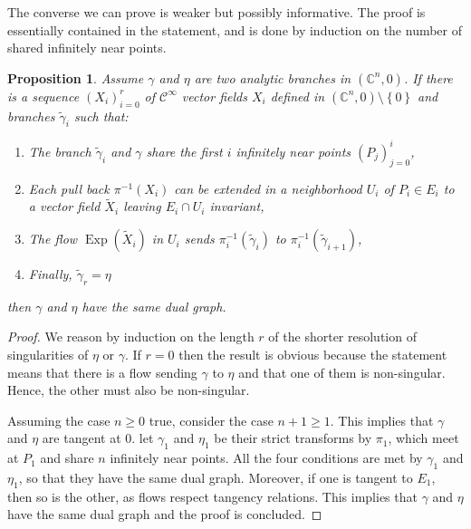 \documentclass[a4paper,10pt]{amsart}
\newtheorem{proposition}[theorem]{Proposition}
\DeclareMathOperator{\Exp}{Exp}
\begin{document}
The converse we can prove is weaker but possibly informative. The proof is essentially contained in the statement, and is done by induction on the number of shared infinitely near points.
\begin{proposition}
  Assume $\gamma$ and $\eta$ are two analytic branches in $(\mathbb{C}^n,0)$. If there is a sequence $(X_i)_{i=0}^{r}$ of $\mathcal{C}^{\infty}$ vector fields $X_i$ defined in $(\mathbb{C}^n,0)\setminus \left\{ 0 \right\}$ and branches $\tilde{\gamma}_{i}$ such that:
  \begin{enumerate}
  \item The branch $\tilde{\gamma}_i$ and $\gamma$ share the first $i$ infinitely near points $(P_j)_{j=0}^i$,
  \item Each pull back $\pi^{-1}(X_{i})$ can be extended in a neighborhood $U_{i}$ of $P_{i}\in E_i$ to a vector field $\tilde{X}_i$ leaving $E_i\cap U_i$ invariant,
  \item The flow $\Exp(\tilde{X}_i)$ in $U_i$ sends $\pi^{-1}_{i}(\tilde{\gamma}_i)$ to $\pi^{-1}_{i}(\tilde{\gamma}_{i+1})$,
  \item Finally, $\tilde{\gamma}_r=\eta$
  \end{enumerate}
  then $\gamma$ and $\eta$ have the same dual graph.
\end{proposition}
\begin{proof}
  We reason by induction on the length $r$ of the shorter resolution of singularities of $\eta$ or $\gamma$. If $r=0$ then the result is obvious because the statement means that there is a flow sending $\gamma$ to $\eta$ and that one of them is non-singular. Hence, the other must also be non-singular.

  Assuming the case $n\geq 0$ true, consider the case $n+1\geq 1$. This implies that $\gamma$ and $\eta$ are tangent at $0$. let $\gamma_1$ and $\eta_1$ be their strict transforms by $\pi_1$, which meet at $P_1$ and share $n$ infinitely near points. All the four conditions are met by $\gamma_1$ and $\eta_1$, so that they have the same dual graph. Moreover, if one is tangent to $E_1$, then so is the other, as flows respect tangency relations. This implies that $\gamma$ and $\eta$ have the same dual graph and the proof is concluded.
\end{proof}
\end{document}
